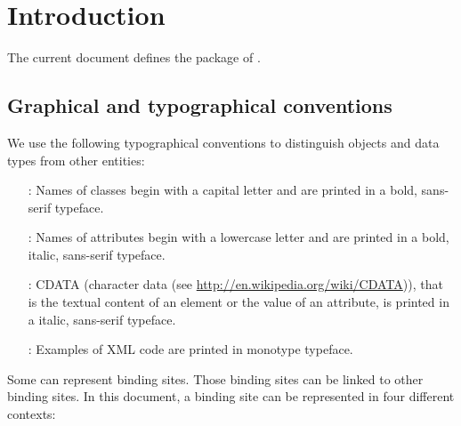 \chapter{Introduction}

The current document defines the package \multiVone of \sbmlLthreeVone. 

\section{Graphical and typographical conventions}

We use the following typographical conventions to distinguish objects and data types from other entities:

\begin{itemize}
 \item[\class{Class}:] Names of classes begin with a capital letter and are printed in a bold, sans-serif typeface. 
 \item[\attribute{attribute}:] Names of attributes begin with a lowercase letter and are printed in a bold, italic, sans-serif typeface. 
 \item[\cdata{value}:] CDATA (character data (see \url{http://en.wikipedia.org/wiki/CDATA})), that is the textual content of an element or the value of an attribute, is printed in a italic, sans-serif typeface.
 \item[\xmlcode{code}:] Examples of XML code are printed in monotype typeface. 
\end{itemize}

Some  can represent binding sites. Those binding sites can be linked to other binding sites. In this document, a binding site can be represented in four different contexts:\\[\baselineskip]

